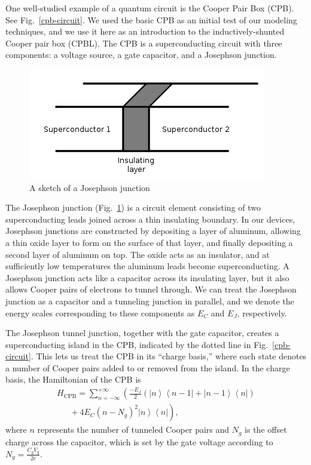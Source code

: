 \documentclass[twocolumn]{revtex4}
\newcommand{\bra}[1]{\left< #1 \right|}
\newcommand{\ket}[1]{\left| #1 \right>}
\begin{document}
One well-studied example of a quantum circuit is the Cooper Pair Box
(CPB)\cite{Nakamura}\cite{Vion}. See Fig.~\ref{cpb-circuit}. We used
the basic CPB as an initial test of our modeling techniques, and we
use it here as an introduction to the inductively-shunted Cooper pair
box (CPBL). The CPB is a superconducting circuit with three
components: a voltage source, a gate capacitor, and a Josephson
junction.

\begin{figure}
  \includegraphics[width=.5\linewidth]{junction.png}
  \caption{ A sketch of a Josephson junction }
  \label{junction}
\end{figure}

The Josephson junction (Fig.~\ref{junction}) is a circuit element
consisting of two superconducting leads joined across a thin
insulating boundary. In our devices, Josephson junctions are
constructed by depositing a layer of aluminum, allowing a thin oxide
layer to form on the surface of that layer, and finally depositing a
second layer of aluminum on top. The oxide acts as an insulator, and
at sufficiently low temperatures the aluminum leads become
superconducting. A Josephson junction acts like a capacitor across its
insulating layer, but it also allows Cooper pairs of electrons to
tunnel through. We can treat the Josephson junction as a capacitor and
a tunneling junction in parallel, and we denote the energy scales
corresponding to these components as $E_C$ and $E_J$, respectively.

The Josephson tunnel junction, together with the gate capacitor,
creates a superconducting island in the CPB, indicated by the dotted
line in Fig.~\ref{cpb-circuit}. This lets us treat the CPB in its
``charge basis,'' where each state denotes a number of Cooper pairs
added to or removed from the island. In the charge basis, the
Hamiltonian of the CPB is
\begin{multline}
\label{cpb-H}
  H_{\text{CPB}} = \sum_{n=-\infty}^{+\infty} \left(\frac{-E_J}{2}\left(
      \ket{n}\bra{n-1} + \ket{n-1}\bra{n} \right)\right. \\
  \left.\phantom{\frac{-E_J}{2}} + 4E_C(n-N_g)^2\ket{n}\bra{n}\right),
\end{multline}
where $n$ represents the number of tunneled Cooper pairs and $N_g$ is
the offset charge across the capacitor, which is set by the gate
voltage according to $N_g=\frac{C_gV_g}{2e}$.
\end{document}
